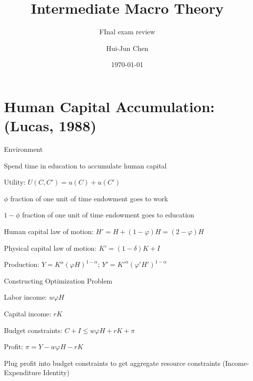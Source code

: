 \documentclass[11pt,aspectratio=169,usenames,dvipsnames]{beamer}
\title[Final Review]{Intermediate Macro Theory}
\subtitle{FInal exam review}
\author{Hui-Jun Chen}
\institute{The Ohio State University}
\date{\today}
\let\tempone\itemize
\let\temptwo\enditemize
\renewenvironment{itemize}{\tempone\addtolength{\itemsep}{\fill}}{\temptwo}
\begin{document}
\begin{frame}[noframenumbering]
    \titlepage
\end{frame}

\section{Human Capital Accumulation: (Lucas, 1988)}
\label{sec:Human_Capital_Accumulation___Lucas__1988_}

\begin{frame}{Environment}
\label{slide:Environment}
\begin{itemize}
    \item Spend \alert{time} in education to accumulate human capital
    \item Utility: $ \displaystyle U(C, C') = u(C) + u(C') $
    \item $ \phi $ fraction of one unit of time endowment goes to \alert{work}
    \item $ 1 - \phi $ fraction of one unit of time endowment goes to \alert{education}
    \item Human capital law of motion: $ \displaystyle H' = H + (1 - \varphi) H = (2 - \varphi)H$
    \item Physical capital law of motion: $ \displaystyle K' = (1 - \delta)K + I $
    \item Production: $ \displaystyle Y = K^{\alpha} (\varphi H)^{1 - \alpha} $; $ \displaystyle Y' = K'^{\alpha} (\varphi' H')^{1 - \alpha} $
\end{itemize}

\end{frame}

\begin{frame}{Constructing Optimization Problem}
\label{slide:Constructing_Optimization_Problem}
    \begin{itemize}
        \item Labor income: $ w \varphi H $
        \item Capital income: $ \displaystyle r K $
        \item Budget constraints: $ \displaystyle C + I \le w \varphi H + r K + \pi $
        \item Profit: $ \displaystyle \pi = Y - w \varphi H - r K $
        \item Plug profit into budget constraints to get aggregate resource constraints (Income-Expenditure Identity)
    \end{itemize}
\end{frame}
\end{document}
